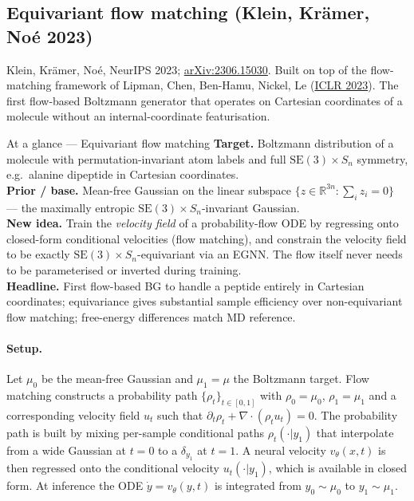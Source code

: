 \documentclass[11pt,letterpaper]{article}
\newcommand{\Real}{\mathbb{R}}
\theoremstyle{plain}
\begin{document}
\subsection{Equivariant flow matching (Klein, Krämer, Noé 2023)}

Klein, Krämer, Noé, NeurIPS 2023;
\href{https://arxiv.org/abs/2306.15030}{arXiv:2306.15030}. Built on top of the
flow-matching framework of Lipman, Chen, Ben-Hamu, Nickel, Le
(\href{https://arxiv.org/abs/2210.02747}{ICLR 2023}). The first flow-based
Boltzmann generator that operates on Cartesian coordinates of a molecule without
an internal-coordinate featurisation.

\begin{methodbox}{At a glance --- Equivariant flow matching}
\textbf{Target.} Boltzmann distribution of a molecule with permutation-invariant
atom labels and full $\mathrm{SE}(3)\times S_n$ symmetry, e.g.\ alanine
dipeptide in Cartesian coordinates.\\
\textbf{Prior / base.} Mean-free Gaussian on the linear subspace
$\{z\in\Real^{3n}:\sum_i z_i=0\}$ --- the maximally entropic
$\mathrm{SE}(3)\times S_n$-invariant Gaussian.\\
\textbf{New idea.} Train the \emph{velocity field} of a probability-flow ODE by
regressing onto closed-form conditional velocities (flow matching), and
constrain the velocity field to be exactly $\mathrm{SE}(3)\times S_n$-equivariant
via an EGNN. The flow itself never needs to be parameterised or inverted during
training.\\
\textbf{Headline.} First flow-based BG to handle a peptide entirely in
Cartesian coordinates; equivariance gives substantial sample efficiency over
non-equivariant flow matching; free-energy differences match MD reference.
\end{methodbox}

\paragraph{Setup.} Let $\mu_0$ be the mean-free Gaussian and $\mu_1=\mu$ the
Boltzmann target. Flow matching constructs a probability path
$\{\rho_t\}_{t\in[0,1]}$ with $\rho_0=\mu_0$, $\rho_1=\mu_1$ and a corresponding
velocity field $u_t$ such that $\partial_t\rho_t + \nabla\cdot(\rho_t u_t)=0$.
The probability path is built by mixing per-sample conditional paths
$\rho_t(\cdot|y_1)$ that interpolate from a wide Gaussian at $t=0$ to a
$\delta_{y_1}$ at $t=1$. A neural velocity $v_\theta(x,t)$ is then regressed
onto the conditional velocity $u_t(\cdot|y_1)$, which is available in closed
form. At inference the ODE $\dot y=v_\theta(y,t)$ is integrated from
$y_0\sim\mu_0$ to $y_1\sim\mu_1$.
\end{document}
